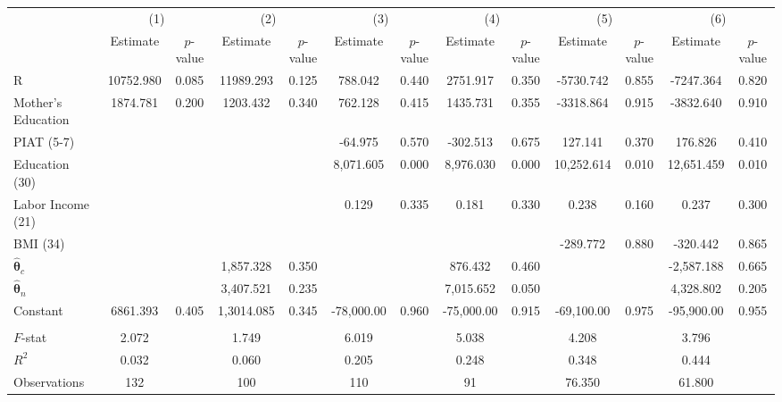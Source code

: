 \begin{tabular}{lcccccccccccc} \toprule
 & \multicolumn{2}{c}{(1)}  &  \multicolumn{2}{c}{(2)}  &  \multicolumn{2}{c}{(3)}  &  \multicolumn{2}{c}{(4)}  & \multicolumn{2}{c}{(5)} & \multicolumn{2}{c}{(6)} \\  
 & Estimate & $p$-value & Estimate & $p$-value & Estimate & $p$-value & Estimate & $p$-value & Estimate & $p$-value & Estimate & $p$-value \\ \midrule
R & 10752.980 &     0.085 & 11989.293 &     0.125 &   788.042 &     0.440 &  2751.917 &     0.350 & -5730.742 &     0.855 & -7247.364 &     0.820 \\  
Mother's Education &  1874.781 &     0.200 &  1203.432 &     0.340 &   762.128 &     0.415 &  1435.731 &     0.355 & -3318.864 &     0.915 & -3832.640 &     0.910 \\  
PIAT (5-7) &         &         &         &         &   -64.975 &     0.570 &  -302.513 &     0.675 &   127.141 &     0.370 &   176.826 &     0.410 \\  
Education (30) &         &         &         &         &  8,071.605 &     0.000 &  8,976.030 &     0.000 & 10,252.614 &     0.010 & 12,651.459 &     0.010 \\  
Labor Income (21) &         &         &         &         &     0.129 &     0.335 &     0.181 &     0.330 &     0.238 &     0.160 &     0.237 &     0.300 \\  
BMI (34) &         &         &         &         &         &         &         &         &  -289.772 &     0.880 &  -320.442 &     0.865 \\  
$\hat{\bm{\theta}}_{c}$  &         &         &  1,857.328 &     0.350 &         &         &   876.432 &     0.460 &         &         & -2,587.188 &     0.665 \\  
$\hat{\bm{\theta}}_{n}$  &         &         &  3,407.521 &     0.235 &         &         &  7,015.652 &     0.050 &         &         &  4,328.802 &     0.205 \\  
Constant  &  6861.393 &     0.405 & 1,3014.085 &     0.345 & -78,000.00 &     0.960 & -75,000.00 &     0.915 & -69,100.00 &     0.975 & -95,900.00 &     0.955 \\ \\ \midrule
$F$-stat &     2.072 &      &     1.749 &      &     6.019 &      &     5.038 &      &     4.208 &      &     3.796 &      \\  
$R^2$ &     0.032 &      &     0.060 &      &     0.205 &      &     0.248 &      &     0.348 &      &     0.444 &     \\  
Observations &   132 &    &    100 &      &   110 &     &    91 &     &    76.350 &      &    61.800 &     \\  
\bottomrule \end{tabular}
